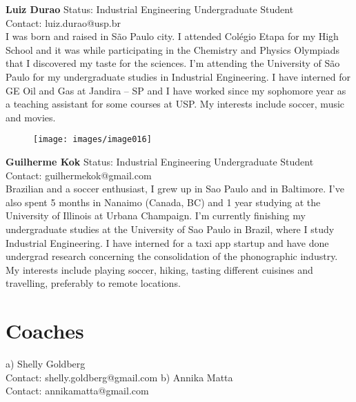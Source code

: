 \textbf{Luiz Durao}
Status: Industrial Engineering Undergraduate Student \\
Contact: luiz.durao@usp.br \\
I was born and raised in São Paulo city. I attended Colégio Etapa for my High School and it was while participating in the Chemistry and Physics Olympiads that I discovered my taste for the sciences. I’m attending the University of São Paulo for my undergraduate studies in Industrial Engineering. I have interned for GE Oil and Gas at Jandira – SP and I have worked since my sophomore year as a teaching assistant for some courses at USP. My interests include soccer, music and movies.

\begin{figure}[h]
  \centering
     \texttt{[image: images/image016]}
  \label{fig:16}
\end{figure}

\textbf{Guilherme Kok}
Status: Industrial Engineering Undergraduate Student \\
Contact: guilhermekok@gmail.com \\
Brazilian and a soccer enthusiast, I grew up in Sao Paulo and in Baltimore. I’ve also spent 5 months in Nanaimo (Canada, BC) and 1 year studying at the University of Illinois at Urbana Champaign. I’m currently finishing my undergraduate studies at the University of Sao Paulo in Brazil, where I study Industrial Engineering. I have interned for a taxi app startup and have done undergrad research concerning the consolidation of the phonographic industry. My interests include playing soccer, hiking, tasting different cuisines and travelling, preferably to remote locations. 

\section{Coaches}
a) Shelly Goldberg \\
Contact: shelly.goldberg@gmail.com
b) Annika Matta \\
Contact: annikamatta@gmail.com